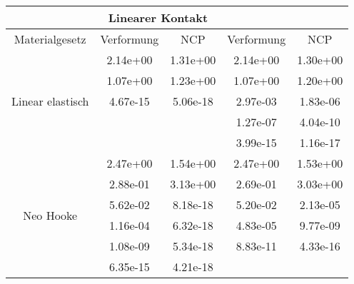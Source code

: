 \begin{table} 
\centering 
\begin{tabular}{c|cc|cc|} 
\cline{2-5} 
 & \multicolumn{2}{|c|}{Linearer Kontakt} &  \\ 
\hline 
\multicolumn{1}{|c|}{Materialgesetz} & \multicolumn{1}{c|}{Verformung} & \multicolumn{1}{c|}{NCP} & \multicolumn{1}{c|}{Verformung} & \multicolumn{1}{c|}{NCP} \\ 
\hline 
\multicolumn{1}{|c|}{\multirow{5}{*}{Linear elastisch}} &\multicolumn{1}{|c|}{  2.14e+00} & \multicolumn{1}{|c|}{  1.31e+00} & \multicolumn{1}{|c|}{  2.14e+00} & \multicolumn{1}{|c|}{  1.30e+00} \\ 
\multicolumn{1}{|c|}{} & \multicolumn{1}{|c|}{  1.07e+00} & \multicolumn{1}{|c|}{  1.23e+00} & \multicolumn{1}{|c|}{  1.07e+00} & \multicolumn{1}{|c|}{  1.20e+00} \\ 
\multicolumn{1}{|c|}{} & \multicolumn{1}{|c|}{  4.67e-15} & \multicolumn{1}{|c|}{  5.06e-18} & \multicolumn{1}{|c|}{  2.97e-03} & \multicolumn{1}{|c|}{  1.83e-06} \\ 
\multicolumn{1}{|c|}{} & \multicolumn{1}{|c|}{} & \multicolumn{1}{|c|}{} & \multicolumn{1}{|c|}{  1.27e-07} & \multicolumn{1}{|c|}{  4.04e-10} \\ 
\multicolumn{1}{|c|}{} & \multicolumn{1}{|c|}{} & \multicolumn{1}{|c|}{} & \multicolumn{1}{|c|}{  3.99e-15} & \multicolumn{1}{|c|}{  1.16e-17} \\ 
\hline 
\multicolumn{1}{|c|}{\multirow{6}{*}{Neo Hooke}} &\multicolumn{1}{|c|}{  2.47e+00} & \multicolumn{1}{|c|}{  1.54e+00} & \multicolumn{1}{|c|}{  2.47e+00} & \multicolumn{1}{|c|}{  1.53e+00} \\ 
\multicolumn{1}{|c|}{} & \multicolumn{1}{|c|}{  2.88e-01} & \multicolumn{1}{|c|}{  3.13e+00} & \multicolumn{1}{|c|}{  2.69e-01} & \multicolumn{1}{|c|}{  3.03e+00} \\ 
\multicolumn{1}{|c|}{} & \multicolumn{1}{|c|}{  5.62e-02} & \multicolumn{1}{|c|}{  8.18e-18} & \multicolumn{1}{|c|}{  5.20e-02} & \multicolumn{1}{|c|}{  2.13e-05} \\ 
\multicolumn{1}{|c|}{} & \multicolumn{1}{|c|}{  1.16e-04} & \multicolumn{1}{|c|}{  6.32e-18} & \multicolumn{1}{|c|}{  4.83e-05} & \multicolumn{1}{|c|}{  9.77e-09} \\ 
\multicolumn{1}{|c|}{} & \multicolumn{1}{|c|}{  1.08e-09} & \multicolumn{1}{|c|}{  5.34e-18} & \multicolumn{1}{|c|}{  8.83e-11} & \multicolumn{1}{|c|}{  4.33e-16} \\ 
\multicolumn{1}{|c|}{} & \multicolumn{1}{|c|}{  6.35e-15} & \multicolumn{1}{|c|}{  4.21e-18} & \multicolumn{1}{|c|}{} & \multicolumn{1}{|c|}{} \\ 

\end{tabular}
\end{table}
